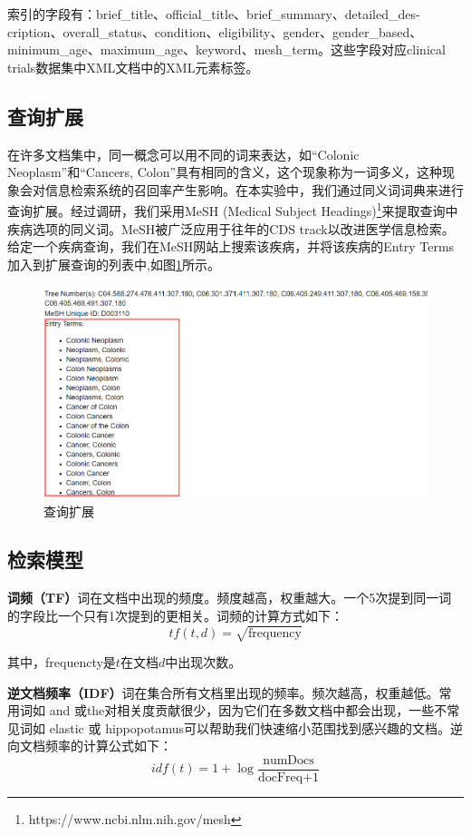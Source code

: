 \documentclass[a4paper]{article}
\begin{document}
索引的字段有：brief\_title、official\_title、brief\_summary、detailed\_des-cription、overall\_status、condition、eligibility、gender、gender\_based、minimum\_age、maximum\_age、keyword、mesh\_term。这些字段对应clinical trials数据集中XML文档中的XML元素标签。

\subsection{查询扩展}
在许多文档集中，同一概念可以用不同的词来表达，如“Colonic Neoplasm”和“Cancers, Colon”具有相同的含义，这个现象称为一词多义，这种现象会对信息检索系统的召回率产生影响\cite{王斌2010信}。在本实验中，我们通过同义词词典来进行查询扩展。经过调研，我们采用MeSH (Medical Subject Headings)\footnote{https://www.ncbi.nlm.nih.gov/mesh}来提取查询中疾病选项的同义词。MeSH被广泛应用于往年的CDS track以改进医学信息检索\cite{balaneshin2015wsu, gurulingappa2016semi, liucas}。给定一个疾病查询，我们在MeSH网站上搜索该疾病，并将该疾病的Entry Terms加入到扩展查询的列表中,如图\ref{fig:expansion}所示。
\begin{figure}[!htbp]\centering
\vspace{1em}{}
  \includegraphics[width=0.4\linewidth]{查询扩展.png}
  \caption{查询扩展} 
  \label{fig:expansion}
  \vspace{1em}
\end{figure}

\subsection{检索模型}
\textbf{词频（TF）}词在文档中出现的频度。频度越高，权重越大。一个5次提到同一词的字段比一个只有1次提到的更相关。词频的计算方式如下：
\begin{equation}
    tf(t, d)=\sqrt{\text{frequency}}
\end{equation}

其中，frequencty是$t$在文档$d$中出现次数。

\textbf{逆文档频率（IDF）}词在集合所有文档里出现的频率。频次越高，权重越低。常用词如 and 或the对相关度贡献很少，因为它们在多数文档中都会出现，一些不常见词如 elastic 或 hippopotamus可以帮助我们快速缩小范围找到感兴趣的文档。逆向文档频率的计算公式如下：
\begin{equation}
    idf(t)=1+\log{\frac{\text{numDocs}}{\text{docFreq+1}}}
\end{equation}
\end{document}
